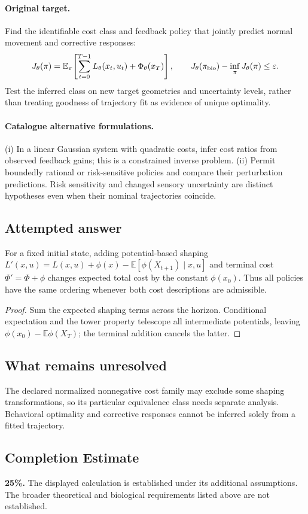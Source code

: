 \documentclass[11pt]{article}
\begin{document}
\paragraph{Original target.}
Find the identifiable cost class and feedback policy that jointly predict normal movement and corrective responses:
\[
J_\theta(\pi)=\mathbb{E}_\pi\!\left[\sum_{t=0}^{T-1}L_\theta(x_t,u_t)+\Phi_\theta(x_T)\right],
\qquad
J_\theta(\pi_{\rm bio})-\inf_\pi J_\theta(\pi)\leq\varepsilon.
\]
Test the inferred class on new target geometries and uncertainty levels, rather than treating goodness of trajectory fit as evidence of unique optimality.
\paragraph{Catalogue alternative formulations.}
(i) In a linear Gaussian system with quadratic costs, infer cost ratios from observed feedback gains; this is a constrained inverse problem. (ii) Permit boundedly rational or risk-sensitive policies and compare their perturbation predictions. Risk sensitivity and changed sensory uncertainty are distinct hypotheses even when their nominal trajectories coincide.
\subsection{Attempted answer}
\begin{proposition}
For a fixed initial state, adding potential-based shaping $L\prime(x,u)=L(x,u)+\phi(x)-\mathbb{E}[\phi(X_{t+1})\mid x,u]$ and terminal cost $\Phi\prime=\Phi+\phi$ changes expected total cost by the constant $\phi(x_0)$. Thus all policies have the same ordering whenever both cost descriptions are admissible.
\end{proposition}
\begin{proof}
Sum the expected shaping terms across the horizon. Conditional expectation and the tower property telescope all intermediate potentials, leaving $\phi(x_0)-\mathbb{E}\phi(X_T)$; the terminal addition cancels the latter.
\end{proof}
\subsection{What remains unresolved}
The declared normalized nonnegative cost family may exclude some shaping transformations, so its particular equivalence class needs separate analysis. Behavioral optimality and corrective responses cannot be inferred solely from a fitted trajectory.
\subsection{Completion Estimate}
\textbf{25\%.} The displayed calculation is established under its additional assumptions. The broader theoretical and biological requirements listed above are not established.
\end{document}
